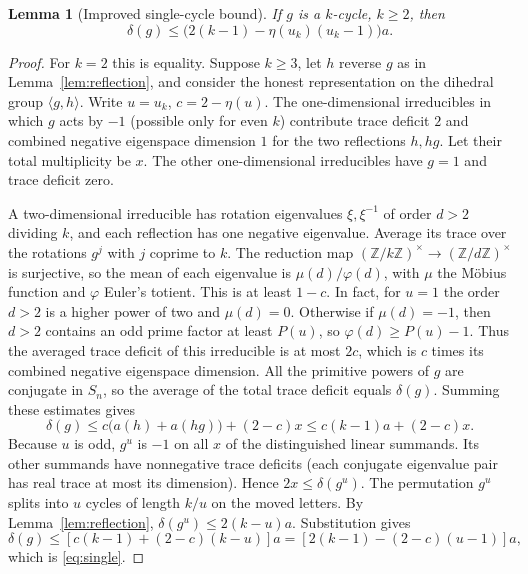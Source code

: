 \documentclass[11pt]{article}
\newtheorem{lemma}[theorem]{Lemma}
\theoremstyle{remark}\newtheorem{remark}[theorem]{Remark}
\begin{document}
\begin{lemma}[Improved single-cycle bound]\label{lem:cycle}
If $g$ is a $k$-cycle, $k\ge2$, then
\begin{equation}\label{eq:single}
 \delta(g)\le\bigl(2(k-1)-\eta(u_k)(u_k-1)\bigr)a.
\end{equation}
\end{lemma}
\begin{proof}
For $k=2$ this is equality. Suppose $k\ge3$, let $h$ reverse $g$ as in Lemma~\ref{lem:reflection}, and consider the honest representation on the dihedral group $\langle g,h\rangle$. Write $u=u_k$, $c=2-\eta(u)$. The one-dimensional irreducibles in which $g$ acts by $-1$ (possible only for even $k$) contribute trace deficit $2$ and combined negative eigenspace dimension $1$ for the two reflections $h,hg$. Let their total multiplicity be $x$. The other one-dimensional irreducibles have $g=1$ and trace deficit zero.

A two-dimensional irreducible has rotation eigenvalues $\xi,\xi^{-1}$ of order $d>2$ dividing $k$, and each reflection has one negative eigenvalue. Average its trace over the rotations $g^j$ with $j$ coprime to $k$. The reduction map $(\mathbb Z/k\mathbb Z)^\times\to(\mathbb Z/d\mathbb Z)^\times$ is surjective, so the mean of each eigenvalue is $\mu(d)/\varphi(d)$, with $\mu$ the M\"obius function and $\varphi$ Euler's totient. This is at least $1-c$. In fact, for $u=1$ the order $d>2$ is a higher power of two and $\mu(d)=0$. Otherwise if $\mu(d)=-1$, then $d>2$ contains an odd prime factor at least $P(u)$, so $\varphi(d)\ge P(u)-1$. Thus the averaged trace deficit of this irreducible is at most $2c$, which is $c$ times its combined negative eigenspace dimension. All the primitive powers of $g$ are conjugate in $S_n$, so the average of the total trace deficit equals $\delta(g)$. Summing these estimates gives
\[
 \delta(g)\le c\bigl(a(h)+a(hg)\bigr)+(2-c)x\le c(k-1)a+(2-c)x.
\]
Because $u$ is odd, $g^u$ is $-1$ on all $x$ of the distinguished linear summands. Its other summands have nonnegative trace deficits (each conjugate eigenvalue pair has real trace at most its dimension). Hence $2x\le\delta(g^u)$. The permutation $g^u$ splits into $u$ cycles of length $k/u$ on the moved letters. By Lemma~\ref{lem:reflection}, $\delta(g^u)\le2(k-u)a$. Substitution gives
\[
 \delta(g)\le[c(k-1)+(2-c)(k-u)]a
 =[2(k-1)-(2-c)(u-1)]a,
\]
which is \eqref{eq:single}.
\end{proof}
\end{document}
